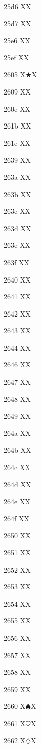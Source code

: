 \documentclass[11pt]{article}
\begin{document}
25d6 X{\LEFTCIRCLE}X

25d7 X{\RIGHTCIRCLE}X

25e6 X{\textopenbullet}X

25ef X{\textbigcircle}X

2605 X{\ensuremath{\bigstar}}X

2609 X{\astrosun}X

260e X{}X

261b X{}X

261e X{}X

2639 X{\frownie}X

263a X{\smiley}X

263b X{\blacksmiley}X

263c X{\sun}X

263d X{\rightmoon}X

263e X{\leftmoon}X

263f X{\mercury}X

2640 X{\venus}X

2641 X{\earth}X

2642 X{\mars}X

2643 X{\jupiter}X

2644 X{\saturn}X

2646 X{\neptune}X

2647 X{\pluto}X

2648 X{\aries}X

2649 X{\taurus}X

264a X{\gemini}X

264b X{\cancer}X

264c X{\leo}X

264d X{\virgo}X

264e X{\libra}X

264f X{\scorpio}X

2650 X{\sagittarius}X

2651 X{\capricornus}X

2652 X{\aquarius}X

2653 X{\pisces}X

2654 X{\symking}X

2655 X{\symqueen}X

2656 X{\symrook}X

2657 X{\symbishop}X

2658 X{\symknight}X

2659 X{\sympawn}X

2660 X{\ensuremath{\spadesuit}}X

2661 X{\ensuremath{\heartsuit}}X

2662 X{\ensuremath{\diamondsuit}}X
\end{document}
